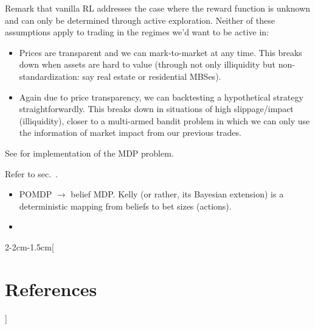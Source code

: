 \documentclass[notitlepage,openany,11pt]{report}
\theoremstyle{plain}%
\numberwithin{equation}{section}
\begin{document}
Remark that vanilla RL addresses the case where the reward function is unknown and can only be determined through active exploration. Neither of these assumptions apply to trading in the regimes we'd want to be active in: 
\begin{itemize}
\item Prices are transparent and we can mark-to-market at any time. This breaks down when assets are hard to value (through not only illiquidity but non-standardization: say real estate or residential MBSes).
\item Again due to price transparency, we can backtesting a hypothetical strategy straightforwardly. This breaks down in situations of high slippage/impact (illiquidity), closer to a multi-armed bandit problem in which we can only use the information of market impact from our previous trades.
\end{itemize}

See \cite{BoydEtAl:17} for implementation of the MDP problem.

Refer to sec.~. 
\begin{itemize}
\item POMDP $\rightarrow$ belief MDP. Kelly (or rather, its Bayesian extension) is a deterministic mapping from beliefs to bet sizes (actions).
\item 

\end{itemize}


\clearpage
{} %

\let\oldthebibliography=\thebibliography
\let\endoldthebibliography=\endthebibliography
\renewenvironment{thebibliography}[1]{%
    \begin{oldthebibliography}{#1}%
    \setlength{\parskip}{3pt plus 2pt minus 1pt}%
    \setlength{\itemsep}{3pt}%
}%
{%
    \end{oldthebibliography}%
}

\begin{adjmulticols*}{2}{-2cm}{-1.5cm}[\section*{References}] %

\noindent
\footnotesize %
\begin{flushleft}


\end{flushleft}
\normalsize

\end{adjmulticols*}
\end{document}
